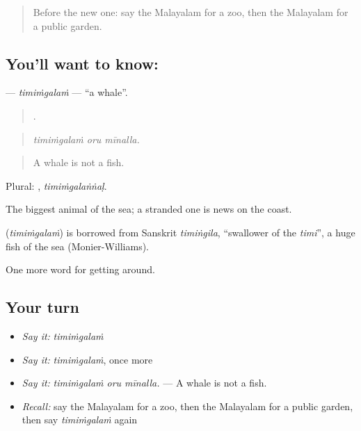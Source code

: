 \label{lesson:ML-C501-timimgalam}



\begin{quote}
Before the new one: say the Malayalam for a zoo, then the Malayalam for a public garden.
\end{quote}

\subsection*{You'll want to know: }
\textbf{} — \emph{timiṁgalaṁ} — \textquotedblleft{}a whale\textquotedblright{}.

\begin{quote}
  .
\end{quote}

\begin{quote}
\emph{timiṁgalaṁ oru mīnalla.}
\end{quote}

\begin{quote}
A whale is not a fish.
\end{quote}

Plural: , \emph{timiṁgalaṅṅaḷ}.

The biggest animal of the sea; a stranded one is news on the coast.

\begin{cousinweb}
\textbf{} (\emph{timiṁgalaṁ}) is borrowed from Sanskrit \emph{timiṅgila}, \textquotedblleft{}swallower of the \emph{timi}\textquotedblright{}, a huge fish of the sea (Monier-Williams).
\end{cousinweb}

\begin{grammarlens}[title={What you've built}]
One more word for getting around.
\end{grammarlens}

\subsection*{Your turn}
\begin{itemize}
\raggedright
  \item \emph{Say it:} \emph{timiṁgalaṁ}
  \item \emph{Say it:} \emph{timiṁgalaṁ}, once more
  \item \emph{Say it:} \emph{timiṁgalaṁ oru mīnalla.} — A whale is not a fish.
  \item \emph{Recall:} say the Malayalam for a zoo, then the Malayalam for a public garden, then say \emph{timiṁgalaṁ} again
\end{itemize}

